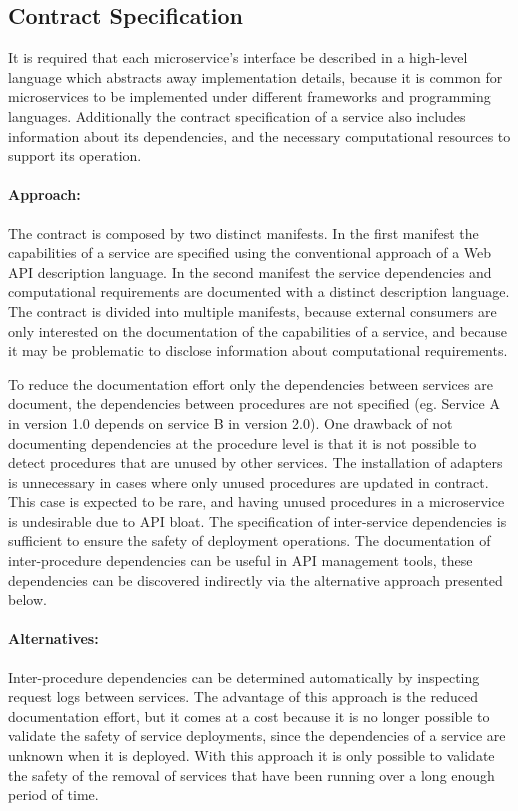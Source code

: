 \subsection{Contract Specification} %
\label{sec:contract_specification}

It is required that each microservice’s interface be
described in a high-level language which abstracts away implementation details, because it is common
for microservices to be implemented under different frameworks and programming languages.
Additionally the contract specification of a service also includes information about its dependencies, and the necessary computational resources to support its operation.

\paragraph{Approach:}
The contract is composed by two distinct manifests.
In the first manifest the capabilities of a service are specified using the conventional approach of a Web API description language.
In the second manifest the service dependencies and computational requirements are documented with a distinct description language.
The contract is divided into multiple manifests, because external consumers are only interested on the documentation of the capabilities of a service,
and because it may be problematic to disclose information about computational requirements.

To reduce the documentation effort only the dependencies between services are document, the dependencies between procedures are not specified (eg. Service A in version 1.0 depends on service B in version 2.0).
One drawback of not documenting dependencies at the procedure level is that it is not possible to detect procedures that are unused by other services.
The installation of adapters is unnecessary in cases where only unused procedures are updated in contract.
This case is expected to be rare, and having unused procedures in a microservice is undesirable due to API bloat.
The specification of inter-service dependencies is sufficient to ensure the safety of deployment operations.
The documentation of inter-procedure dependencies can be useful in API management tools,
these dependencies can be discovered indirectly via the alternative approach presented below.

\paragraph{Alternatives:}
Inter-procedure dependencies can be determined automatically by inspecting request logs between services.
The advantage of this approach is the reduced documentation effort, but it comes at a cost because
it is no longer possible to validate the safety of service deployments, since the dependencies of a service are unknown when it is deployed.
With this approach it is only possible to validate the safety of the removal of services that have been running over a long enough period of time.

